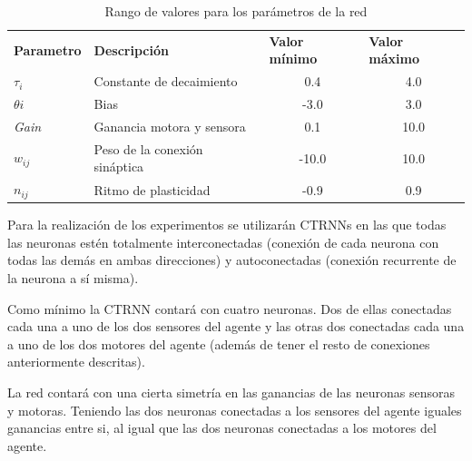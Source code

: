\begin{table}[!h]
\centering
\label{table:tablaValoresParametros}
\begin{tabular}{l|l|c|c}
\textbf{Parametro} & \textbf{Descripción}          & \multicolumn{1}{l|}{\textbf{Valor mínimo}} & \multicolumn{1}{l}{\textbf{Valor máximo}} \\
\textit{$\tau_{i}$}       & Constante de decaimiento      & 0.4                                        & 4.0                                       \\
\textit{$\theta{i}$}      & Bias                          & -3.0                                       & 3.0                                       \\
\textit{Gain}      & Ganancia motora y sensora     & 0.1                                        & 10.0                                      \\
\textit{$w_{ij}$}      & Peso de la conexión sináptica & -10.0                                      & 10.0                                      \\
\textit{$n_{ij}$}     & Ritmo de plasticidad          & -0.9                                       & 0.9
\end{tabular}
\caption{Rango de valores para los parámetros de la red}
\end{table}

Para la realización de los experimentos se utilizarán CTRNNs en las que todas las neuronas
estén totalmente interconectadas (conexión de cada neurona con todas las demás en ambas direcciones) y
autoconectadas (conexión recurrente de la neurona a sí misma).

Como mínimo la CTRNN contará con cuatro neuronas. Dos de ellas conectadas cada una a uno de los dos sensores del agente y las otras dos conectadas cada una a uno de los dos motores del agente (además de
tener el resto de conexiones anteriormente descritas).

La red contará con una cierta simetría en las ganancias de las neuronas sensoras y motoras. Teniendo las dos neuronas conectadas a los sensores del agente iguales ganancias entre si, al igual que las dos neuronas conectadas
a los motores del agente.
